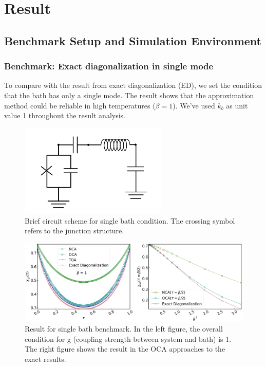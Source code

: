\documentclass{article}[12pt]
\numberwithin{equation}{section}
\begin{document}
\section{Result}
\begin{spacing}{1.5}
\subsection{Benchmark Setup and Simulation Environment}
\subsubsection*{Benchmark: Exact diagonalization in single mode}
To compare with the result from exact diagonalization (ED), we set the condition that the bath has only a single mode. 
The result shows that the approximation method could be reliable in high temperatures ($\beta = 1$). We've used $k_b$ as unit value 1 throughout the result analysis.
\begin{figure}[htbp]
  \centerline{\includegraphics[width=7cm]{TexFigure/4/4_1_00_Singlebath.png}}
  \caption{Brief circuit scheme for single bath condition. The crossing symbol  refers to the junction structure.}
\end{figure}
\begin{figure}[htbp]
  \centerline{\includegraphics[width=13cm]{TexFigure/4/4_1_01_Single.png}}
  \caption{Result for single bath benchmark. In the left figure, the overall condition for g (coupling strength between system and bath) is 1. The right figure shows the result in the OCA approaches to the exact results.}
\end{figure}
\pagebreak

\end{spacing}
\end{document}
